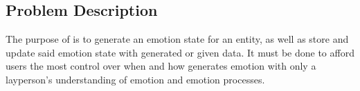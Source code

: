 \subsection{Problem Description} \label{Sec_pd}
The purpose of \progname{} is to generate an emotion state for an entity, as 
well as store and update said emotion state with generated or given data. It 
must be done to afford users the most control over when and how \progname{} 
generates emotion with only a layperson's understanding of emotion and emotion 
processes.





